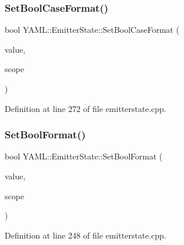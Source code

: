\subsubsection{\texorpdfstring{SetBoolCaseFormat()}{SetBoolCaseFormat()}}
{\footnotesize\ttfamily bool Y\+A\+M\+L\+::\+Emitter\+State\+::\+Set\+Bool\+Case\+Format (\begin{DoxyParamCaption}\item[{\mbox{\hyperlink{namespace_y_a_m_l_a67c320aa50d3de7ecba1d0b8775dd684}{E\+M\+I\+T\+T\+E\+R\+\_\+\+M\+A\+N\+IP}}}]{value,  }\item[{\mbox{\hyperlink{struct_y_a_m_l_1_1_fmt_scope_a58c967eadfafdc79f62cd5c59ec2b1fe}{Fmt\+Scope\+::value}}}]{scope }\end{DoxyParamCaption})}



Definition at line 272 of file emitterstate.\+cpp.

\mbox{\label{class_y_a_m_l_1_1_emitter_state_a4fad94ca5f872e1c051598f6740abf24}} 
\subsubsection{\texorpdfstring{SetBoolFormat()}{SetBoolFormat()}}
{\footnotesize\ttfamily bool Y\+A\+M\+L\+::\+Emitter\+State\+::\+Set\+Bool\+Format (\begin{DoxyParamCaption}\item[{\mbox{\hyperlink{namespace_y_a_m_l_a67c320aa50d3de7ecba1d0b8775dd684}{E\+M\+I\+T\+T\+E\+R\+\_\+\+M\+A\+N\+IP}}}]{value,  }\item[{\mbox{\hyperlink{struct_y_a_m_l_1_1_fmt_scope_a58c967eadfafdc79f62cd5c59ec2b1fe}{Fmt\+Scope\+::value}}}]{scope }\end{DoxyParamCaption})}



Definition at line 248 of file emitterstate.\+cpp.

\mbox{\label{class_y_a_m_l_1_1_emitter_state_adcd943faa13d98eea7c9357ee219dc24}} 
